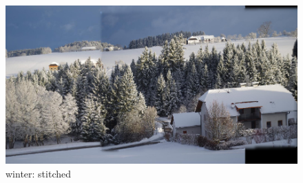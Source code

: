 \documentclass[deutsch]{scrartcl}
\begin{document}
\begin{figure}
\begin{center}
\includegraphics[width=1.0\textwidth]{winterS.png}
\caption{winter: stitched}
\label{fig:winterS}
\end{center}
\end{figure}
\end{document}

